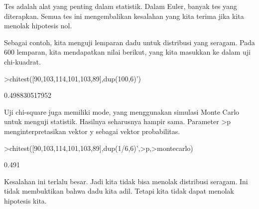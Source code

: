 \documentclass[a4paper,10pt]{article}
\begin{document}
\begin{eulernotebook}
\begin{eulercomment}
\begin{eulercomment}
\begin{eulercomment}
\begin{eulercomment}
\begin{eulercomment}
\begin{eulercomment}
\begin{eulercomment}
\begin{eulercomment}
\begin{eulercomment}
\begin{eulercomment}
\begin{eulercomment}
\begin{eulercomment}
\begin{eulercomment}
\begin{eulercomment}
\begin{eulercomment}
\begin{eulercomment}
\begin{eulercomment}
\begin{eulercomment}
\begin{eulercomment}
Tes adalah alat yang penting dalam statistik. Dalam Euler, banyak tes
yang diterapkan. Semua tes ini mengembalikan kesalahan yang kita
terima jika kita menolak hipotesis nol.

Sebagai contoh, kita menguji lemparan dadu untuk distribusi yang
seragam. Pada 600 lemparan, kita mendapatkan nilai berikut, yang kita
masukkan ke dalam uji chi-kuadrat.
\end{eulercomment}
\begin{eulerprompt}
>chitest([90,103,114,101,103,89],dup(100,6)')
\end{eulerprompt}
\begin{euleroutput}
  0.498830517952
\end{euleroutput}
\begin{eulercomment}
Uji chi-square juga memiliki mode, yang menggunakan simulasi Monte
Carlo untuk menguji statistik. Hasilnya seharusnya hampir sama.
Parameter \textgreater{}p menginterpretasikan vektor y sebagai vektor probabilitas.
\end{eulercomment}
\begin{eulerprompt}
>chitest([90,103,114,101,103,89],dup(1/6,6)',>p,>montecarlo)
\end{eulerprompt}
\begin{euleroutput}
  0.491
\end{euleroutput}
\begin{eulercomment}
Kesalahan ini terlalu besar. Jadi kita tidak bisa menolak distribusi
seragam. Ini tidak membuktikan bahwa dadu kita adil. Tetapi kita tidak
dapat menolak hipotesis kita.


\end{eulercomment}
\end{eulercomment}
\end{eulercomment}
\end{eulercomment}
\end{eulercomment}
\end{eulercomment}
\end{eulercomment}
\end{eulercomment}
\end{eulercomment}
\end{eulercomment}
\end{eulercomment}
\end{eulercomment}
\end{eulercomment}
\end{eulercomment}
\end{eulercomment}
\end{eulercomment}
\end{eulercomment}
\end{eulercomment}
\end{eulercomment}
\end{eulernotebook}
\end{document}
